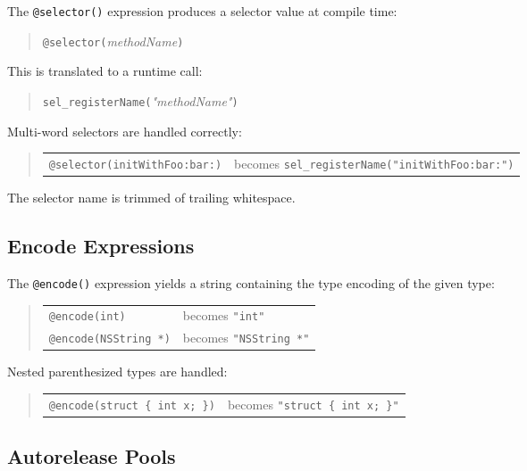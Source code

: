 \documentclass[11pt,twoside]{article}
\newcommand{\meta}[1]{{\itshape #1}}
\begin{document}
The {\tt @selector()} expression produces a selector value at compile
time:
\begin{quote}
{\tt @selector(}{\meta{methodName}}{\tt )}
\end{quote}

This is translated to a runtime call:
\begin{quote}
{\tt sel\_registerName(}{\meta{"methodName"}}{\tt )}
\end{quote}

Multi-word selectors are handled correctly:
\begin{quote}
\begin{tabular}{ll}
{\tt @selector(initWithFoo:bar:)}
  & becomes {\tt sel\_registerName("initWithFoo:bar:")} \\
\end{tabular}
\end{quote}

The selector name is trimmed of trailing whitespace.

\subsection{Encode Expressions}

The {\tt @encode()} expression yields a string containing the type
encoding of the given type:
\begin{quote}
\begin{tabular}{ll}
{\tt @encode(int)}
  & becomes {\tt "int"} \\[4pt]
{\tt @encode(NSString *)}
  & becomes {\tt "NSString *"} \\
\end{tabular}
\end{quote}

Nested parenthesized types are handled:
\begin{quote}
\begin{tabular}{ll}
{\tt @encode(struct \{ int x; \})}
  & becomes {\tt "struct \{ int x; \}"} \\
\end{tabular}
\end{quote}

\subsection{Autorelease Pools}
\end{document}
